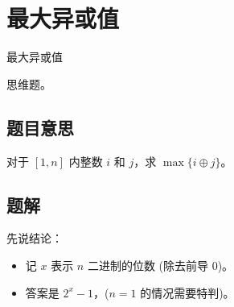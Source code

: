 \def\sectionName{最大异或值}
\section{\sectionName}



\begin{frame}

\isBeamerMode\relax
    {\Huge \sectionName}\par
\fi




思维题。



\end{frame}

\subsection{题目意思}
\begin{frame} %
对于 $[1, n]$ 内整数 $i$ 和 $j$，求 $\max\{i \oplus j\}$。
\end{frame}



\subsection{题解}
\begin{frame} %
先说结论：
\begin{itemize}
    \item 记 $x$ 表示 $n$ 二进制的位数 (除去前导 $0$)。
    \item 答案是 $2^x - 1$，($n = 1$ 的情况需要特判)。
\end{itemize}
\end{frame}


